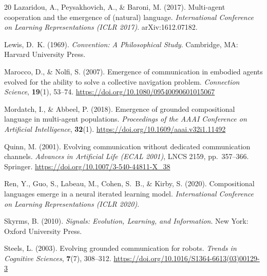 \documentclass[12pt,letterpaper]{article}
\begin{document}
\begin{thebibliography}{20}
Lazaridou, A., Peysakhovich, A., \& Baroni, M. (2017).
Multi-agent cooperation and the emergence of (natural) language.
\emph{International Conference on Learning Representations (ICLR 2017)}.
arXiv:1612.07182.

Lewis, D.~K. (1969).
\emph{Convention: A Philosophical Study}.
Cambridge, MA: Harvard University Press.

Marocco, D., \& Nolfi, S. (2007).
Emergence of communication in embodied agents evolved for the ability to solve
a collective navigation problem.
\emph{Connection Science}, \textbf{19}(1), 53--74.
\url{https://doi.org/10.1080/09540090601015067}

Mordatch, I., \& Abbeel, P. (2018).
Emergence of grounded compositional language in multi-agent populations.
\emph{Proceedings of the AAAI Conference on Artificial Intelligence}, \textbf{32}(1).
\url{https://doi.org/10.1609/aaai.v32i1.11492}

Quinn, M. (2001).
Evolving communication without dedicated communication channels.
\emph{Advances in Artificial Life (ECAL 2001)}, LNCS 2159, pp.~357--366. Springer.
\url{https://doi.org/10.1007/3-540-44811-X_38}

Ren, Y., Guo, S., Labeau, M., Cohen, S.~B., \& Kirby, S. (2020).
Compositional languages emerge in a neural iterated learning model.
\emph{International Conference on Learning Representations (ICLR 2020)}.

Skyrms, B. (2010).
\emph{Signals: Evolution, Learning, and Information}.
New York: Oxford University Press.

Steels, L. (2003).
Evolving grounded communication for robots.
\emph{Trends in Cognitive Sciences}, \textbf{7}(7), 308--312.
\url{https://doi.org/10.1016/S1364-6613(03)00129-3}

\end{thebibliography}
\end{document}
